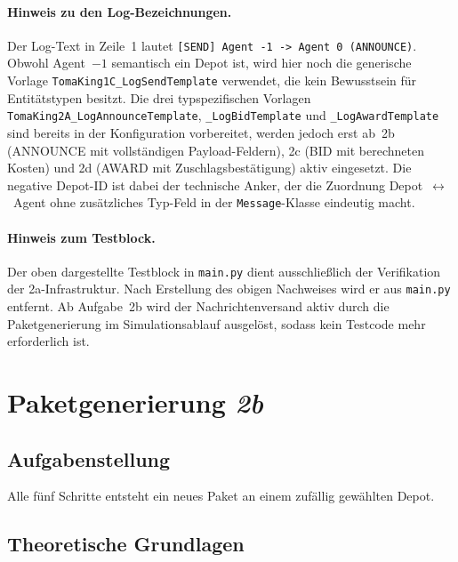 \paragraph{Hinweis zu den Log-Bezeichnungen.}
Der Log-Text in Zeile~1 lautet \texttt{[SEND] Agent -1 -> Agent 0 (ANNOUNCE)}. Obwohl Agent~\(-1\) semantisch ein Depot ist, wird hier noch die generische Vorlage \texttt{TomaKing1C\_LogSendTemplate} verwendet, die kein Bewusstsein für Entitätstypen besitzt. Die drei typspezifischen Vorlagen \texttt{TomaKing2A\_LogAnnounceTemplate}, \texttt{\_LogBidTemplate} und \texttt{\_LogAwardTemplate} sind bereits in der Konfiguration vorbereitet, werden jedoch erst ab~2b (ANNOUNCE mit vollständigen Payload-Feldern), 2c (BID mit berechneten Kosten) und 2d (AWARD mit Zuschlagsbestätigung) aktiv eingesetzt. Die negative Depot-ID ist dabei der technische Anker, der die Zuordnung Depot~\(\leftrightarrow\)~Agent ohne zusätzliches Typ-Feld in der \texttt{Message}-Klasse eindeutig macht.

\paragraph{Hinweis zum Testblock.}
Der oben dargestellte Testblock in \texttt{main.py} dient ausschließlich der Verifikation der 2a-Infrastruktur. Nach Erstellung des obigen Nachweises wird er aus \texttt{main.py} entfernt. Ab Aufgabe~2b wird der Nachrichtenversand aktiv durch die Paketgenerierung im Simulationsablauf ausgelöst, sodass kein Testcode mehr erforderlich ist.


\section{Paketgenerierung \textit{2b}}
\label{sec:aufgabe2b}

\subsection{Aufgabenstellung}

Alle fünf Schritte entsteht ein neues Paket an einem zufällig gewählten Depot.

\subsection{Theoretische Grundlagen}

